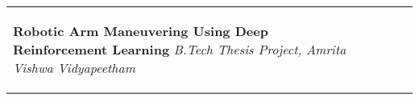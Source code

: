 \documentclass[10pt,a4]{article}
\begin{document}
{\begin{tabu}
\begin{center}
\begin{tabular} {p{} p{} p{} p{}}
\begin{flushleft}

        \item \hspace{1.5mm} \textbf{\large Robotic Arm Maneuvering Using Deep Reinforcement Learning}
        \hfill \textit{B.Tech Thesis Project, Amrita Vishwa Vidyapeetham}


\end{flushleft}
\end{tabular}
\end{center}
\end{tabu}}
\end{document}
